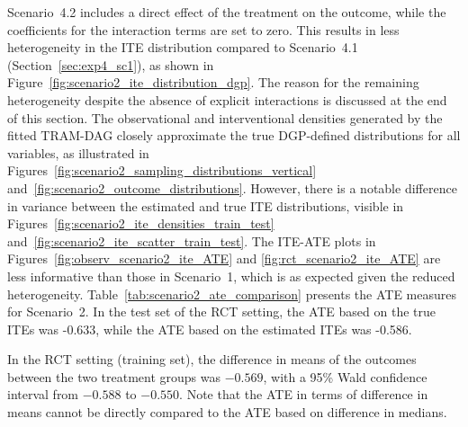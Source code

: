 Scenario~4.2 includes a direct effect of the treatment on the outcome, while the coefficients for the interaction terms are set to zero. This results in less heterogeneity in the ITE distribution compared to Scenario~4.1 (Section~\ref{sec:exp4_sc1}), as shown in Figure~\ref{fig:scenario2_ite_distribution_dgp}. The reason for the remaining heterogeneity despite the absence of explicit interactions is discussed at the end of this section.
The observational and interventional densities generated by the fitted TRAM-DAG closely approximate the true DGP-defined distributions for all variables, as illustrated in Figures~\ref{fig:scenario2_sampling_distributions_vertical} and~\ref{fig:scenario2_outcome_distributions}. However, there is a notable difference in variance between the estimated and true ITE distributions, visible in Figures~\ref{fig:scenario2_ite_densities_train_test} and~\ref{fig:scenario2_ite_scatter_train_test}. The ITE-ATE plots in Figures~\ref{fig:observ_scenario2_ite_ATE} and \ref{fig:rct_scenario2_ite_ATE} are less informative than those in Scenario~1, which is as expected given the reduced heterogeneity. Table~\ref{tab:scenario2_ate_comparison} presents the ATE measures for Scenario~2. In the test set of the RCT setting, the ATE based on the true ITEs was -0.633, while the ATE based on the estimated ITEs was -0.586.

In the RCT setting (training set), the difference in means of the outcomes between the two treatment groups was 
$-0.569$, with a 95\% Wald confidence interval from 
$-0.588$ to 
$-0.550$. Note that the ATE in terms of difference in means cannot be directly compared to the ATE based on difference in medians.



